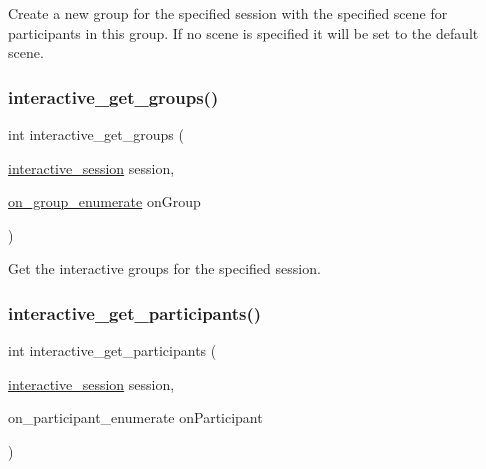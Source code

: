 Create a new group for the specified session with the specified scene for participants in this group. If no scene is specified it will be set to the default scene. 

\mbox{\label{group___interactivity_gac48f6aafcb999fa604314fcb494c14cc}} 
\subsubsection{\texorpdfstring{interactive\+\_\+get\+\_\+groups()}{interactive\_get\_groups()}}
{\footnotesize\ttfamily int interactive\+\_\+get\+\_\+groups (\begin{DoxyParamCaption}\item[{\mbox{\hyperlink{group___interactivity_ga6d8819d38b8dc8994a2299cf22a65a31}{interactive\+\_\+session}}}]{session,  }\item[{\mbox{\hyperlink{group___interactivity_ga94f3f5e9c3f20ed45e333767263adbc2}{on\+\_\+group\+\_\+enumerate}}}]{on\+Group }\end{DoxyParamCaption})}



Get the interactive groups for the specified session. 

\mbox{\label{group___interactivity_ga51aa5a660a864a3d574e17806c51ac50}} 
\subsubsection{\texorpdfstring{interactive\+\_\+get\+\_\+participants()}{interactive\_get\_participants()}}
{\footnotesize\ttfamily int interactive\+\_\+get\+\_\+participants (\begin{DoxyParamCaption}\item[{\mbox{\hyperlink{group___interactivity_ga6d8819d38b8dc8994a2299cf22a65a31}{interactive\+\_\+session}}}]{session,  }\item[{on\+\_\+participant\+\_\+enumerate}]{on\+Participant }\end{DoxyParamCaption})}



